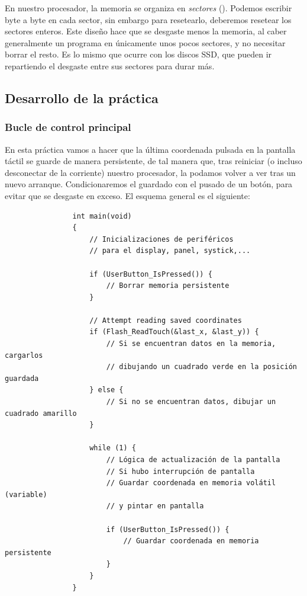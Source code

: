 \documentclass[../main.tex]{subfiles}
\begin{document}
            En nuestro procesador, la memoria  se organiza en \emph{sectores} (\REFMAN[3.3.1]). Podemos escribir byte a byte en cada sector, sin embargo para resetearlo, deberemos resetear los sectores enteros. Este diseño hace que se desgaste menos la memoria, al caber generalmente un programa en únicamente unos pocos sectores, y no necesitar borrar el resto. Es lo mismo que ocurre con los discos SSD, que pueden ir repartiendo el desgaste entre sus sectores para durar más.

    \subsection{Desarrollo de la práctica}

        \subsubsection{Bucle de control principal}

            En esta práctica vamos a hacer que la última coordenada pulsada en la pantalla táctil se guarde de manera persistente, de tal manera que, tras reiniciar (o incluso desconectar de la corriente) nuestro procesador, la podamos volver a ver tras un nuevo arranque. Condicionaremos el guardado con el pusado de un botón, para evitar que se desgaste en exceso. El esquema general es el siguiente:

            \begin{lstlisting}
                int main(void)
                {
                    // Inicializaciones de periféricos 
                    // para el display, panel, systick,...

                    if (UserButton_IsPressed()) {
                        // Borrar memoria persistente
                    }

                    // Attempt reading saved coordinates
                    if (Flash_ReadTouch(&last_x, &last_y)) {
                        // Si se encuentran datos en la memoria, cargarlos
                        // dibujando un cuadrado verde en la posición guardada
                    } else {
                        // Si no se encuentran datos, dibujar un cuadrado amarillo
                    }

                    while (1) {
                        // Lógica de actualización de la pantalla
                        // Si hubo interrupción de pantalla
                        // Guardar coordenada en memoria volátil (variable) 
                        // y pintar en pantalla
                        
                        if (UserButton_IsPressed()) {
                            // Guardar coordenada en memoria persistente
                        }
                    }
                }
            \end{lstlisting}
\end{document}
